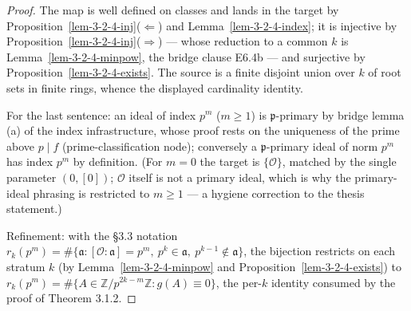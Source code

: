 \begin{proof}
  The map is well defined on classes and lands in the target by
  Proposition~\ref{lem-3-2-4-inj}($\Leftarrow$) and
  Lemma~\ref{lem-3-2-4-index}; it is injective by
  Proposition~\ref{lem-3-2-4-inj}($\Rightarrow$) — whose reduction to a common
  $k$ is Lemma~\ref{lem-3-2-4-minpow}, the bridge clause E6.4b — and surjective
  by Proposition~\ref{lem-3-2-4-exists}. The source is a finite disjoint union
  over $k$ of root sets in finite rings, whence the displayed cardinality
  identity.

  For the last sentence: an ideal of index $p^m$ ($m \ge 1$) is
  $\mathfrak{p}$-primary by bridge lemma (a) of the index infrastructure, whose
  proof rests on the uniqueness of the prime above $p \mid f$
  (prime-classification node); conversely a $\mathfrak{p}$-primary ideal of norm
  $p^m$ has index $p^m$ by definition. (For $m = 0$ the target is
  $\{\mathcal{O}\}$, matched by the single parameter $(0, [0])$; $\mathcal{O}$
  itself is not a primary ideal, which is why the primary-ideal phrasing is
  restricted to $m \ge 1$ — a hygiene correction to the thesis statement.)

  Refinement: with the \S 3.3 notation
  $r_k(p^m) = \#\{\mathfrak{a} : [\mathcal{O}:\mathfrak{a}] = p^m,\
  p^k \in \mathfrak{a},\ p^{k-1}\notin\mathfrak{a}\}$, the bijection restricts on
  each stratum $k$ (by Lemma~\ref{lem-3-2-4-minpow} and
  Proposition~\ref{lem-3-2-4-exists}) to
  $r_k(p^m) = \#\{A \in \mathbb{Z}/p^{2k-m}\mathbb{Z} : g(A) \equiv 0\}$,
  the per-$k$ identity consumed by the proof of Theorem 3.1.2.
\end{proof}
